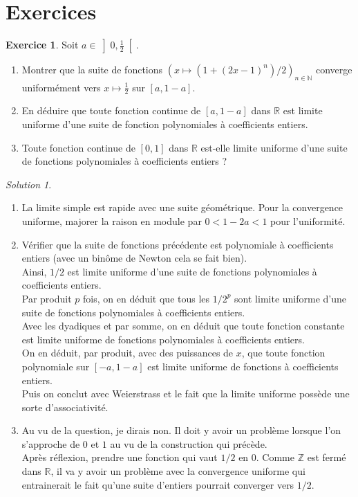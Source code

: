 \documentclass[french]{book}
\newcommand{\N}{\mathbb{N}}
\newcommand{\Z}{\mathbb{Z}}
\newcommand{\R}{\mathbb{R}}
\theoremstyle{definition}
\newtheorem{ex}{Exercice}[chapter]
\theoremstyle{remark}
\newtheorem*{sol}{Solution}
\begin{document}
\section{Exercices}

\begin{ex}
	Soit $a\in\displaystyle\left]0,\frac{1}{2}\right[$.
	\begin{enumerate}
		\item Montrer que la suite de fonctions $\displaystyle\left(x\mapsto(1+(2x-1)^n)/2\right)_{n\in\N}$ converge uniformément vers $x\mapsto\displaystyle\frac12$ sur $[a,1-a]$.
		\item En déduire que toute fonction continue de $[a,1-a]$ dans $\R$ est limite uniforme d'une suite de fonction polynomiales à coefficients entiers.
		\item Toute fonction continue de $[0,1]$ dans $\R$ est-elle limite uniforme d'une suite de fonctions polynomiales à coefficients entiers ?
	\end{enumerate}
\end{ex}
\begin{sol}
	\begin{enumerate}
		\item La limite simple est rapide avec une suite géométrique. Pour la convergence uniforme, majorer la raison en module par $0<1-2a<1$ pour l'uniformité.
		\item Vérifier que la suite de fonctions précédente est polynomiale à coefficients entiers (avec un binôme de Newton cela se fait bien). \\ Ainsi, $1/2$ est limite uniforme d'une suite de fonctions polynomiales à coefficients entiers. \\ Par produit $p$ fois, on en déduit que tous les $1/2^p$ sont limite uniforme d'une suite de fonctions polynomiales à coefficients entiers. \\  Avec les dyadiques et par somme, on en déduit que toute fonction constante est limite uniforme de fonctions polynomiales à coefficients entiers. \\ On en déduit, par produit, avec des puissances de $x$, que toute fonction polynomiale sur $[-a,1-a]$ est limite uniforme de fonctions à coefficients entiers. \\ Puis on conclut avec Weierstrass et le fait que la limite uniforme possède une sorte d'associativité.
		\item Au vu de la question, je dirais non. Il doit y avoir un problème lorsque l'on s'approche de $0$ et $1$ au vu de la construction qui précède. \\  Après réflexion, prendre une fonction qui vaut $1/2$ en $0$. Comme $\Z$ est fermé dans $\R$, il va y avoir un problème avec la convergence uniforme qui entrainerait le fait qu'une suite d'entiers pourrait converger vers $1/2$.
	\end{enumerate}
\end{sol}
\end{document}
